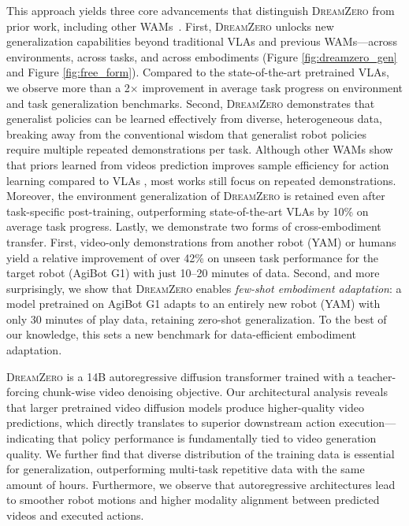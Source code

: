 \documentclass[10pt,logo,copyright]{nvidiatechreport}
\newcommand{\ourmethod}{\mbox{\textsc{DreamZero}}\xspace}
\begin{document}
This approach yields three core advancements that distinguish \ourmethod from prior work, including other WAMs~\citep{kim2026cosmos,liang2025video,pai2025mimic}. First, \ourmethod unlocks new generalization capabilities beyond traditional VLAs and previous WAMs—across environments, across tasks, and across embodiments (Figure \ref{fig:dreamzero_gen} and Figure \ref{fig:free_form}). Compared to the state-of-the-art pretrained VLAs, we observe more than a 2$\times$ improvement in average task progress on environment and task generalization benchmarks. Second, \ourmethod demonstrates that generalist policies can be learned effectively from diverse, heterogeneous data, breaking away from the conventional wisdom that generalist robot policies require multiple repeated demonstrations per task. Although other WAMs show that priors learned from videos prediction improves sample efficiency for action learning compared to VLAs \citep{pai2025mimic, liao2025genie}, most works still focus on repeated demonstrations. 
Moreover, the environment generalization of \ourmethod is retained even after task-specific post-training, outperforming state-of-the-art VLAs by 10\% on average task progress. Lastly, we demonstrate two forms of cross-embodiment transfer. First, video-only demonstrations from another robot (YAM) or humans yield a relative improvement of over 42\% on unseen task performance for the target robot (AgiBot G1) with just 10–20 minutes of data. Second, and more surprisingly, we show that \ourmethod enables \textit{few-shot embodiment adaptation}: a model pretrained on AgiBot G1 adapts to an entirely new robot (YAM) with only 30 minutes of play data, retaining zero-shot generalization. To the best of our knowledge, this sets a new benchmark for data-efficient embodiment adaptation.

\ourmethod is a 14B autoregressive diffusion transformer trained with a teacher-forcing chunk-wise video denoising objective.
Our architectural analysis reveals that larger pretrained video diffusion models produce higher-quality video predictions, which directly translates to superior downstream action execution—indicating that policy performance is fundamentally tied to video generation quality. We further find that diverse distribution of the training data is essential for generalization, outperforming multi-task repetitive data with the same amount of hours. Furthermore, we observe that autoregressive architectures lead to smoother robot motions and higher modality alignment between predicted videos and executed actions.
\end{document}
